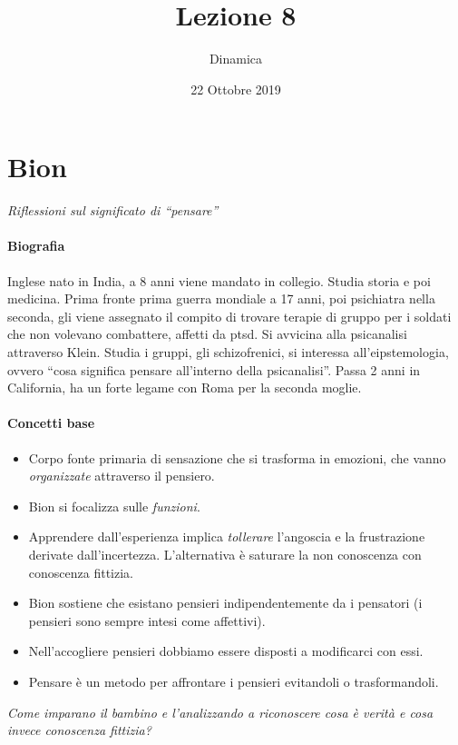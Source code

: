 \documentclass[12pt, a4paper]{article}
\date{22 Ottobre 2019}
\title{Lezione 8}
\author{Dinamica}
\begin{document}
\maketitle

\section{Bion}

\emph{Riflessioni sul significato di ``pensare''}

\paragraph{Biografia} Inglese nato in India, a 8 anni viene mandato in collegio. Studia storia e poi medicina. Prima fronte prima guerra mondiale a 17 anni, poi psichiatra nella seconda, gli viene assegnato il compito di trovare terapie di gruppo per i soldati che non volevano combattere, affetti da ptsd. Si avvicina alla psicanalisi attraverso Klein. Studia i gruppi, gli schizofrenici, si interessa all'eipstemologia, ovvero ``cosa significa pensare
all'interno della psicanalisi''. Passa 2 anni in California, ha un forte legame con Roma per la seconda moglie.\\
\smallskip
\paragraph{Concetti base}
\begin{itemize}
    \item Corpo fonte primaria di sensazione che si trasforma in emozioni, che vanno \emph{organizzate} attraverso il pensiero.
    \item Bion si focalizza sulle \emph{funzioni}.
    \item Apprendere dall'esperienza implica \emph{tollerare} l'angoscia e la frustrazione derivate dall'incertezza. L'alternativa \`e saturare la non conoscenza con conoscenza fittizia.
    \item Bion sostiene che esistano pensieri indipendentemente da i pensatori (i pensieri sono sempre intesi come affettivi).
    \item Nell'accogliere  pensieri dobbiamo essere disposti a modificarci con essi.
    \item Pensare \`e un metodo per affrontare i pensieri evitandoli o trasformandoli.
\end{itemize}

\emph{Come imparano il bambino e l'analizzando a riconoscere cosa \`e verit\`a e cosa invece conoscenza fittizia?}
\end{document}
